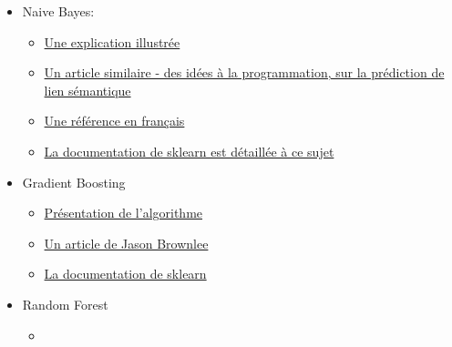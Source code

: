 \documentclass[a4paper,11pt]{article}
\begin{document}
\begin{itemize}
    \item Naive Bayes:
        \begin{itemize}
            \item {\color{blue} \href{https://www.analyticsvidhya.com/blog/2017/09/naive-bayes-explained/}{Une explication illustrée}}
            \item {\color{blue} \href{https://monkeylearn.com/blog/practical-explanation-naive-bayes-classifier/}{Un article similaire - des idées à la programmation, sur la prédiction de lien sémantique}}
            \item {\color{blue} \href{https://mrmint.fr/naive-bayes-classifier}{Une référence en français}}
            \item {\color{blue} \href{https://scikit-learn.org/stable/modules/naive_bayes.html}{La documentation de sklearn est détaillée à ce sujet}}

        \end{itemize}
    \item Gradient Boosting 
        \begin{itemize}
            \item {\color{blue} \href{https://machinelearningmastery.com/gentle-introduction-gradient-boosting-algorithm-machine-learning/}{Présentation de l'algorithme}}
            \item {\color{blue} \href{https://machinelearningmastery.com/gentle-introduction-gradient-boosting-algorithm-machine-learning/}{Un article de Jason Brownlee}}

            \item {\color{blue} \href{https://scikit-learn.org/stable/modules/generated/sklearn.ensemble.GradientBoostingClassifier.html}{La documentation de sklearn}}
        \end{itemize}
    \item Random Forest 
        \begin{itemize}
            \item {\color{blue} \href{}{}}
        \end{itemize}
    
\end{itemize}


{\color{blue} \href{}{}}
\end{document}
